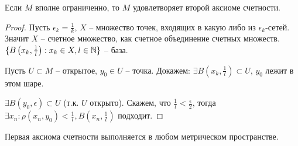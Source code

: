 \documentclass[main]{subfiles}
\begin{document}
\begin{proposition}
    Если $M$ вполне ограниченно, то $M$ удовлетворяет второй аксиоме счетности.
\end{proposition}
\begin{proof}
    Пусть $\epsilon_k = \frac{1}{k}$, $X$ -- множество точек, входящих в какую либо из $\epsilon_k$-сетей.
    Значит $X$ -- счетное множество, как счетное объединение счетных множеств.
    $\{B\left(x_k, \frac{1}{l}\right) : x_k \in X, l \in \mathbb{N}\}$ -- база.

    Пусть $U \subset M$ -- открытое, $y_0 \in U$ -- точка.
    Докажем: $\exists B\left(x_k, \frac{1}{l}\right)\subset U$, $y_0$ лежит в этом шаре.

    $\exists B(y_0, \epsilon) \subset U$ (т.к. $U$ открыто).
    Скажем, что $\frac{1}{l} < \frac{\epsilon}{2}$,
    тогда $\exists x_n: \rho(x_n, y_0) < \frac{1}{l}, B\left(x_n, \frac{1}{l}\right)$ подходит.
\end{proof}
\begin{remark}
    Первая аксиома счетности выполняется в любом метрическом пространстве.
\end{remark}
\end{document}
